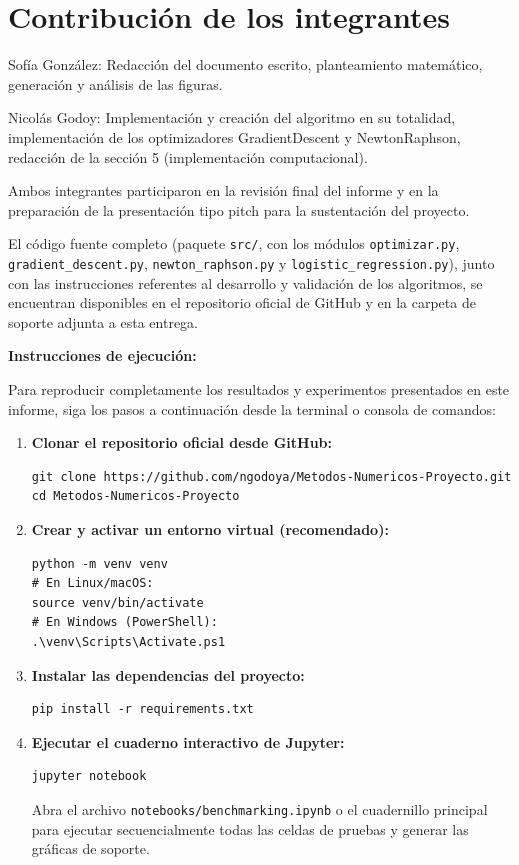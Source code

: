 \section{Contribución de los integrantes}

Sofía González: Redacción del documento escrito, planteamiento matemático, generación y análisis de las figuras. 

Nicolás Godoy: Implementación y creación del algoritmo en su totalidad, implementación de los optimizadores GradientDescent y NewtonRaphson, redacción de la sección 5 (implementación computacional). 

Ambos integrantes participaron en la revisión final del informe y en la preparación de la presentación tipo pitch para la sustentación del proyecto.

\vspace{0.5cm}

\noindent El código fuente completo (paquete \texttt{src/}, con los módulos \texttt{optimizar.py}, \texttt{gradient\_descent.py}, \texttt{newton\_raphson.py} y \texttt{logistic\_regression.py}), junto con las instrucciones referentes al desarrollo y validación de los algoritmos, se encuentran disponibles en el repositorio oficial de GitHub y en la carpeta de soporte adjunta a esta entrega.

\vspace{0.3cm}
\noindent \textbf{Instrucciones de ejecución:} 

 Para reproducir completamente los resultados y experimentos presentados en este informe, siga los pasos a continuación desde la terminal o consola de comandos:

\begin{enumerate}
    \item \textbf{Clonar el repositorio oficial desde GitHub:}
    \begin{verbatim}
git clone https://github.com/ngodoya/Metodos-Numericos-Proyecto.git
cd Metodos-Numericos-Proyecto
    \end{verbatim}

    \item \textbf{Crear y activar un entorno virtual (recomendado):}
    \begin{verbatim}
python -m venv venv
# En Linux/macOS:
source venv/bin/activate
# En Windows (PowerShell):
.\venv\Scripts\Activate.ps1
    \end{verbatim}

    \item \textbf{Instalar las dependencias del proyecto:}
    \begin{verbatim}
pip install -r requirements.txt
    \end{verbatim}

    \item \textbf{Ejecutar el cuaderno interactivo de Jupyter:}
    \begin{verbatim}
jupyter notebook
    \end{verbatim}
    Abra el archivo \texttt{notebooks/benchmarking.ipynb} o el cuadernillo principal para ejecutar secuencialmente todas las celdas de pruebas y generar las gráficas de soporte.
\end{enumerate}

